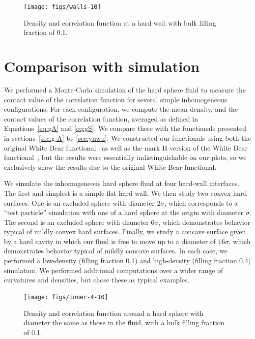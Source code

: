 \documentclass[letterpaper,twocolumn,amsmath,amssymb,jcp,10pt,aip]{revtex4-1}
\begin{document}
\begin{figure}
  \texttt{[image: figs/walls-10]}
  \caption{Density and correlation function at a hard wall with bulk
    filling fraction of 0.1.}
  \label{fig:walls-10}
\end{figure}

\section{Comparison with simulation}\label{sec:comparison}

We performed a Monte-Carlo simulation of the hard sphere fluid to
measure the contact value of the correlation function for several
simple inhomogeneous configurations.  For each configuration, we
compute the mean density, and the contact values of the correlation
function, averaged as defined in Equations~\ref{eq:gA} and
\ref{eq:gS}.  We compare these with the functionals presented in
sections~\ref{sec:g-A} to~\ref{sec:yuwu}.  We constructed our
functionals using both the original White Bear
functional~\cite{roth2002whitebear} as well as the mark II version of
the White Bear functional~\cite{hansen2006density}, but the results
were essentially indistinguishable on our plots, so we exclusively
show the results due to the original White Bear functional.

We simulate the inhomogeneous hard sphere fluid at four hard-wall
interfaces.  The first and simplest is a simple flat hard wall.  We
then study two convex hard surfaces.  One is an excluded sphere with
diameter $2\sigma$, which corresponds to a ``test particle''
simulation with one of a hard sphere at the origin with diameter
$\sigma$.  The second is an excluded sphere with diameter $6\sigma$,
which demonstrates behavior typical of mildly convex hard surfaces.
Finally, we study a concave surface given by a hard cavity in which
our fluid is free to move up to a diameter of $16\sigma$, which
demonstrates behavior typical of mildly concave surfaces.  In each
case, we performed a low-density (filling fraction 0.1) and high-density
(filling fraction 0.4) simulation.  We performed additional
computations over a wider range of curvatures and densities, but
chose these as typical examples.


\begin{figure}
  \texttt{[image: figs/inner-4-10]}
  \caption{Density and correlation function around a hard sphere with
    diameter the same as those in the fluid, with a bulk filling
    fraction of 0.1.}
  \label{fig:inner-4-10}
\end{figure}
\end{document}
